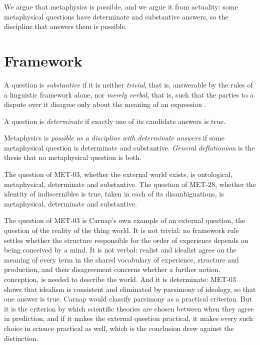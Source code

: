 \documentclass{situationist-preprint}
\begin{document}
We argue that metaphysics is possible, and we argue it from actuality: some metaphysical questions have determinate and substantive answers, so the discipline that answers them is possible.

\section{Framework}

\begin{definition}[Substantive]\label{d:subst}
A question is \emph{substantive} if it is neither \emph{trivial}, that is, answerable by the rules of a linguistic framework alone, nor \emph{merely verbal}, that is, such that the parties to a dispute over it disagree only about the meaning of an expression \citep{Chalmers2011}.
\end{definition}

\begin{definition}[Determinate]\label{d:det}
A question is \emph{determinate} if exactly one of its candidate answers is true.
\end{definition}

\begin{definition}\label{d:poss}
Metaphysics is \emph{possible as a discipline with determinate answers} if some metaphysical question is determinate and substantive. \emph{General deflationism} is the thesis that no metaphysical question is both.
\end{definition}

\begin{assumption}[Witnesses]\label{a:witness}
The question of MET-03, whether the external world exists, is ontological, metaphysical, determinate and substantive. The question of MET-28, whether the identity of indiscernibles is true, taken in each of its disambiguations, is metaphysical, determinate and substantive.
\end{assumption}

The question of MET-03 is Carnap's own example of an external question, the question of the reality of the thing world. It is not trivial: no framework rule settles whether the structure responsible for the order of experience depends on being conceived by a mind. It is not verbal: realist and idealist agree on the meaning of every term in the shared vocabulary of experience, structure and production, and their disagreement concerns whether a further notion, conception, is needed to describe the world. And it is determinate: MET-03 shows that idealism is consistent and eliminated by parsimony of ideology, so that one answer is true. Carnap would classify parsimony as a practical criterion. But it is the criterion by which scientific theories are chosen between when they agree in prediction, and if it makes the external question practical, it makes every such choice in science practical as well, which is the conclusion \citet{Quine1951} drew against the distinction.
\end{document}

